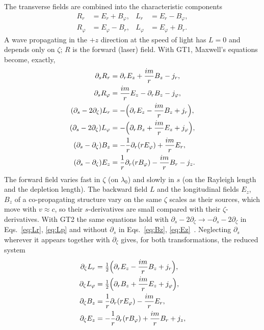 \documentclass[preprint,12pt]{elsarticle}
\begin{document}
The transverse fields are combined into the characteristic components
\begin{align}
R_r &= E_r + B_\varphi, & L_r &= E_r - B_\varphi, \nonumber\\
R_\varphi &= E_\varphi - B_r, & L_\varphi &= E_\varphi + B_r .
\end{align}
A wave propagating in the $+z$ direction at the speed of light has $L = 0$ and depends only on $\zeta$; $R$ is the forward (laser) field. With GT1, Maxwell's equations become, exactly,
\begin{align}
\partial_s R_r &= \partial_r E_z + \frac{im}{r} B_z - j_r, \label{eq:Rr}\\
\partial_s R_\varphi &= \frac{im}{r} E_z - \partial_r B_z - j_\varphi, \label{eq:Rp}\\
(\partial_s - 2\partial_\zeta) L_r &= -\Bigl(\partial_r E_z - \frac{im}{r}B_z + j_r\Bigr), \label{eq:Lr}\\
(\partial_s - 2\partial_\zeta) L_\varphi &= -\Bigl(\partial_r B_z + \frac{im}{r}E_z + j_\varphi\Bigr), \label{eq:Lp}\\
(\partial_s - \partial_\zeta) B_z &= -\frac{1}{r}\partial_r (r E_\varphi) + \frac{im}{r} E_r, \label{eq:Bz}\\
(\partial_s - \partial_\zeta) E_z &= \frac{1}{r}\partial_r (r B_\varphi) - \frac{im}{r} B_r - j_z . \label{eq:Ez}
\end{align}
The forward field varies fast in $\zeta$ (on $\lambda_0$) and slowly in $s$ (on the Rayleigh length and the depletion length). The backward field $L$ and the longitudinal fields $E_z$, $B_z$ of a co-propagating structure vary on the same $\zeta$ scales as their sources, which move with $v \approx c$, so their $s$-derivatives are small compared with their $\zeta$-derivatives. With GT2 the same equations hold with $\partial_s - 2\partial_\zeta \to -\partial_s - 2\partial_\zeta$ in Eqs.~\eqref{eq:Lr}, \eqref{eq:Lp} and without $\partial_s$ in Eqs.~\eqref{eq:Bz}, \eqref{eq:Ez}~\cite{GEMPIC}. Neglecting $\partial_s$ wherever it appears together with $\partial_\zeta$ gives, for both transformations, the reduced system
\begin{align}
\partial_\zeta L_r &= \tfrac12\Bigl(\partial_r E_z - \frac{im}{r}B_z + j_r\Bigr), \label{eq:Lr2}\\
\partial_\zeta L_\varphi &= \tfrac12\Bigl(\partial_r B_z + \frac{im}{r}E_z + j_\varphi\Bigr), \label{eq:Lp2}\\
\partial_\zeta B_z &= \frac{1}{r}\partial_r (r E_\varphi) - \frac{im}{r} E_r, \label{eq:Bz2}\\
\partial_\zeta E_z &= -\frac{1}{r}\partial_r (r B_\varphi) + \frac{im}{r} B_r + j_z , \label{eq:Ez2}
\end{align}
\end{document}
